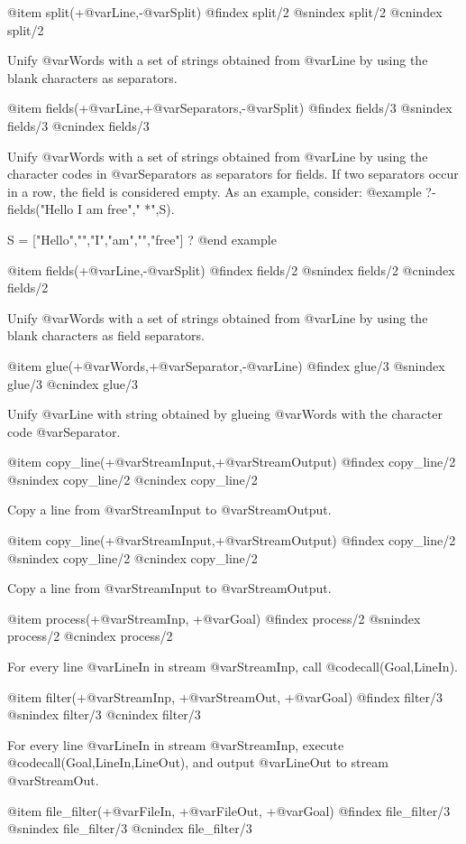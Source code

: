 {{{{{{{{@item split(+@var{Line},-@var{Split})
@findex split/2
@snindex split/2
@cnindex split/2

Unify @var{Words} with a set of strings obtained from @var{Line} by
using the blank characters  as separators.

@item fields(+@var{Line},+@var{Separators},-@var{Split})
@findex fields/3
@snindex fields/3
@cnindex fields/3

Unify @var{Words} with a set of strings obtained from @var{Line} by
using the character codes in @var{Separators} as separators for
fields. If two separators occur in a row, the field is considered
empty. As an example, consider:
@example
?- fields("Hello  I am  free"," *",S).

S = ["Hello","","I","am","","free"] ?
@end example

@item fields(+@var{Line},-@var{Split})
@findex fields/2
@snindex fields/2
@cnindex fields/2

Unify @var{Words} with a set of strings obtained from @var{Line} by
using the blank characters  as field separators.

@item glue(+@var{Words},+@var{Separator},-@var{Line})
@findex glue/3
@snindex glue/3
@cnindex glue/3

Unify @var{Line} with  string obtained by glueing @var{Words} with
the character code @var{Separator}.

@item copy_line(+@var{StreamInput},+@var{StreamOutput})
@findex copy_line/2
@snindex copy_line/2
@cnindex copy_line/2

Copy a line from @var{StreamInput} to @var{StreamOutput}.

@item copy_line(+@var{StreamInput},+@var{StreamOutput})
@findex copy_line/2
@snindex copy_line/2
@cnindex copy_line/2

Copy a line from @var{StreamInput} to @var{StreamOutput}.

@item process(+@var{StreamInp}, +@var{Goal})
@findex process/2
@snindex process/2
@cnindex process/2

For every line @var{LineIn} in stream @var{StreamInp}, call
@code{call(Goal,LineIn)}.

@item filter(+@var{StreamInp}, +@var{StreamOut}, +@var{Goal})
@findex filter/3
@snindex filter/3
@cnindex filter/3

For every line @var{LineIn} in stream @var{StreamInp}, execute
@code{call(Goal,LineIn,LineOut)}, and output @var{LineOut} to
stream @var{StreamOut}.

@item file_filter(+@var{FileIn}, +@var{FileOut}, +@var{Goal})
@findex file_filter/3
@snindex file_filter/3
@cnindex file_filter/3

}}}}}}}}
